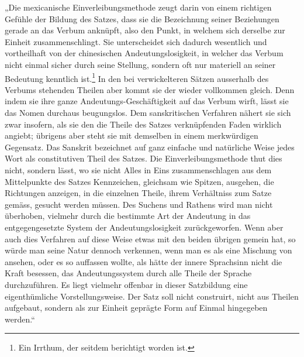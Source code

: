 „Die mexicanische Einverleibungsmethode zeugt darin von einem richtigen Gefühle der Bildung des Satzes, dass sie die Bezeichnung seiner Beziehungen gerade an das Verbum anknüpft, also den Punkt, in welchem sich derselbe zur Einheit zusammenschlingt. Sie unterscheidet sich dadurch wesentlich und vortheilhaft von der chinesischen Andeutungslosigkeit, in welcher das Verbum nicht einmal sicher durch seine Stellung, sondern oft nur materiell an seiner Bedeutung kenntlich ist.\footnote{Ein Irrthum, der seitdem berichtigt worden ist.} In den bei verwickelteren Sätzen ausserhalb des Verbums stehenden Theilen aber kommt sie der   wieder vollkommen gleich. Denn indem sie ihre ganze Andeutungs-Geschäftigkeit auf das Verbum wirft, lässt sie das Nomen durchaus beugungslos. Dem sanskritischen Verfahren nähert sie sich zwar insofern, als sie den die Theile des Satzes verknüpfenden Faden wirklich angiebt; übrigens aber steht sie mit demselben in einem merkwürdigen Gegensatz. Das Sanskrit bezeichnet auf ganz einfache und natürliche Weise jedes Wort als constitutiven Theil des Satzes. Die Einverleibungsmethode thut dies nicht, sondern lässt, wo sie nicht Alles in Eins zusammenschlagen  aus dem Mittelpunkte des Satzes Kennzeichen, gleichsam wie Spitzen, ausgehen, die Richtungen anzeigen, in  die einzelnen Theile, ihrem Verhältniss zum Satze gemäss, gesucht werden müssen. Des Suchens und Rathens wird man nicht überhoben, vielmehr durch die bestimmte Art der Andeutung in das \label{sp.357} entgegengesetzte System der Andeutungslosigkeit zurückgeworfen. Wenn aber auch dies Verfahren auf diese Weise etwas mit den beiden übrigen \label{fp.339} gemein hat, so würde man seine Natur dennoch verkennen, wenn man es als eine Mischung von  ansehen, oder es so auffassen \label{fp.208} wollte, als hätte der innere Sprachsinn nicht die Kraft besessen, das Andeutungssystem durch alle Theile der Sprache durchzuführen. Es liegt vielmehr offenbar in dieser  Satzbildung eine eigenthümliche Vorstellungsweise. Der Satz soll nicht construirt, nicht aus Theilen  aufgebaut, sondern als zur Einheit geprägte Form auf Einmal hingegeben werden.“

